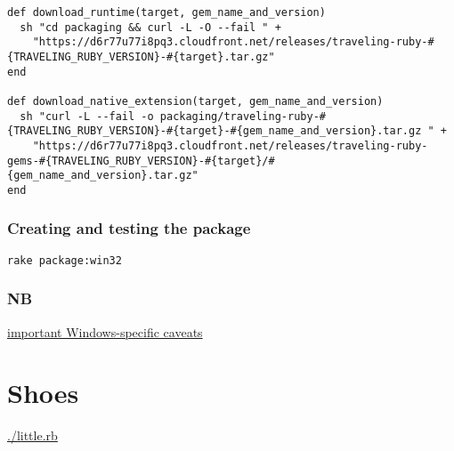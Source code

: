 \documentclass[11pt]{article}
\begin{document}
\begin{verbatim}
def download_runtime(target, gem_name_and_version)
  sh "cd packaging && curl -L -O --fail " +
    "https://d6r77u77i8pq3.cloudfront.net/releases/traveling-ruby-#{TRAVELING_RUBY_VERSION}-#{target}.tar.gz"
end

def download_native_extension(target, gem_name_and_version)
  sh "curl -L --fail -o packaging/traveling-ruby-#{TRAVELING_RUBY_VERSION}-#{target}-#{gem_name_and_version}.tar.gz " +
    "https://d6r77u77i8pq3.cloudfront.net/releases/traveling-ruby-gems-#{TRAVELING_RUBY_VERSION}-#{target}/#{gem_name_and_version}.tar.gz"
end
\end{verbatim}

\subsubsection{Creating and testing the package}
\label{sec-2-1-4}

\begin{verbatim}
rake package:win32
\end{verbatim}

\subsubsection{NB}
\label{sec-2-1-5}

\href{https://github.com/phusion/traveling-ruby/blob/master/README.md#caveats}{important Windows-specific caveats}



\section{Shoes}
\label{sec-3}

\url{./little.rb}
\end{document}
